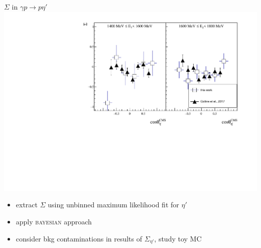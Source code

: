\documentclass[11pt,aspectratio=169,dvipsnames]{beamer}
\newcommand{\thecolor}{black!70!blue}
\begin{document}
\begin{frame}{$\Sigma$ in $\gamma p \to p \eta'$}
	\includegraphics[width=\linewidth]{../../DPG2022/figs/sigma.pdf}
\end{frame}
\begin{frame}
\begin{tcolorbox}[colback=blue!5,colframe=\thecolor,title={To Do}]
	\begin{itemize}
		
		\item extract $\Sigma$ using unbinned maximum likelihood fit for $\eta'$
		\item apply \textsc{bayesian} approach 
		\item consider bkg contaminations in results of $\Sigma_{\eta'}$, study toy MC
		
	\end{itemize}
\end{tcolorbox}
\end{frame}




	
\end{document}
